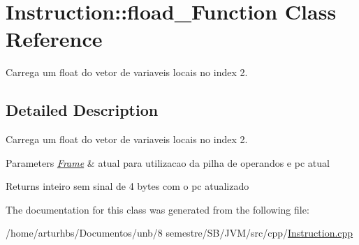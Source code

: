 \hypertarget{classInstruction_1_1fload__2Function}{}\section{Instruction\+:\+:fload\+\_\+Function Class Reference}
\label{classInstruction_1_1fload__2Function}


Carrega um float do vetor de variaveis locais no index 2.  




\subsection{Detailed Description}
Carrega um float do vetor de variaveis locais no index 2. 


\begin{DoxyParams}{Parameters}
{\em \hyperlink{classFrame}{Frame}} & atual para utilizacao da pilha de operandos e pc atual \\
\hline
\end{DoxyParams}
\begin{DoxyReturn}{Returns}
inteiro sem sinal de 4 bytes com o pc atualizado 
\end{DoxyReturn}


The documentation for this class was generated from the following file\+:\begin{DoxyCompactItemize}
\item 
/home/arturhbs/\+Documentos/unb/8 semestre/\+S\+B/\+J\+V\+M/src/cpp/\hyperlink{Instruction_8cpp}{Instruction.\+cpp}\end{DoxyCompactItemize}
